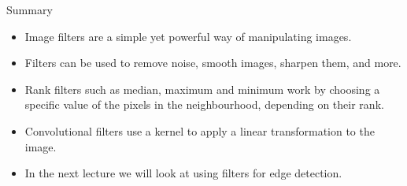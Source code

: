 \documentclass[9pt, aspectratio=169]{beamer}
\begin{document}
\begin{frame}
{Summary}
\begin{itemize}
\item Image filters are a simple yet powerful way of manipulating images.
\item Filters can be used to remove noise, smooth images, sharpen them, and more.
\item Rank filters such as median, maximum and minimum work by choosing a specific value of the pixels in the neighbourhood, depending on their rank.
\item Convolutional filters use a kernel to apply a linear transformation to the image.
\item In the next lecture we will look at using filters for edge detection.
\end{itemize}


\end{frame}
\end{document}
